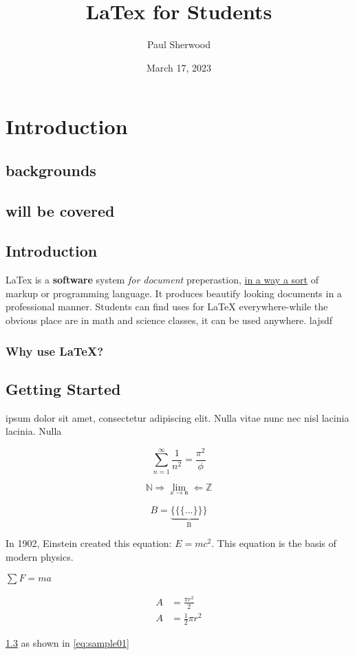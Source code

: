 \documentclass{report}%
\title{\Huge{LaTex for Students}}
\author{\huge{Paul Sherwood}}
\date{March 17, 2023}
\begin{document}
\maketitle
\setcounter{chapter}{2}
\chapter{\centering Introduction}
\section{backgrounds}
\section{will be covered}
\section{Introduction}\label{sec:intro}

LaTex is a \textbf{software} system \textit{for document} preperastion, \underline{in a way a sort} of markup or programming language.  It produces beautify looking documents in a professional manner.  Students can find uses for LaTeX everywhere-while the obvious place are in math and science classes, it can be used anywhere.
lajsdf

\subsection{Why use LaTeX?}

\section{Getting Started}
ipsum dolor sit amet, consectetur adipiscing elit. Nulla vitae nunc nec nisl lacinia lacinia. Nulla


\[
\sum_{n = 1}^{\infty}
\frac{1}{n^2} = \frac{\pi^2}{\phi }
\]

\begin{equation}\label{eq:sample01}
    \mathbb{N}
    \Rightarrow
    \lim_{x \to \mathfrak{n}} 
    \Leftarrow
    \mathbb{Z}
\end{equation}

\[
B = \underbrace{\{\{\{ . . . \}\}\}}_{\text{B}}
\]

In 1902, Einstein created this equation: $E=mc^2$.  This equation is the basis of modern physics.

$\sum F=ma$

\begin{equation} \label{eq1}
    \begin{split}
        A & = \frac{\pi r^2}{2} \\
        A & = \frac{1}{2} \pi r^2
    \end{split}
\end{equation}

\ref{sec:intro} as shown in \ref{eq:sample01}
\end{document}
